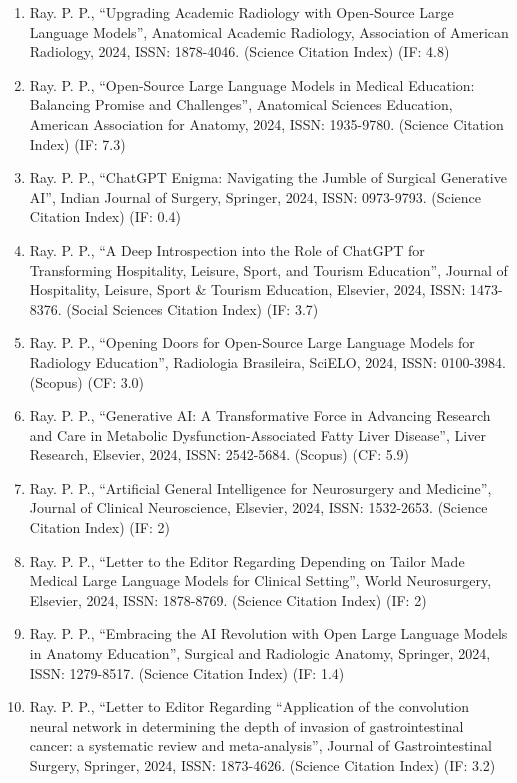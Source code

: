 \documentclass[11pt,a4paper]{moderncv}
\begin{document}
\begin{adjustwidth}{6em}{0pt}
\begin{enumerate}
		\item Ray. P. P., “Upgrading Academic Radiology with Open-Source Large Language Models”, Anatomical Academic Radiology, Association of American Radiology, 2024, ISSN: 1878-4046. (Science Citation Index) (IF: 4.8)
		\item Ray. P. P., “Open-Source Large Language Models in Medical Education: Balancing Promise and Challenges”, Anatomical Sciences Education, American Association for Anatomy, 2024, ISSN: 1935-9780. (Science Citation Index) (IF: 7.3)
		\item Ray. P. P., “ChatGPT Enigma: Navigating the Jumble of Surgical Generative AI”, Indian Journal of Surgery, Springer, 2024, ISSN: 0973-9793. (Science Citation Index) (IF: 0.4)
		\item Ray. P. P., “A Deep Introspection into the Role of ChatGPT for Transforming Hospitality, Leisure, Sport, and Tourism Education”, Journal of Hospitality, Leisure, Sport \& Tourism Education, Elsevier, 2024, ISSN: 1473-8376. (Social Sciences Citation Index) (IF: 3.7)
		\item Ray. P. P., “Opening Doors for Open-Source Large Language Models for Radiology Education”, Radiologia Brasileira, SciELO, 2024, ISSN: 0100-3984. (Scopus) (CF: 3.0)
		\item Ray. P. P., “Generative AI: A Transformative Force in Advancing Research and Care in Metabolic Dysfunction-Associated Fatty Liver Disease”, Liver Research, Elsevier, 2024, ISSN: 2542-5684. (Scopus) (CF: 5.9)
		\item Ray. P. P., “Artificial General Intelligence for Neurosurgery and Medicine”, Journal of Clinical Neuroscience, Elsevier, 2024, ISSN: 1532-2653. (Science Citation Index) (IF: 2)
		\item Ray. P. P., “Letter to the Editor Regarding Depending on Tailor Made Medical Large Language Models for Clinical Setting”, World Neurosurgery, Elsevier, 2024, ISSN: 1878-8769. (Science Citation Index) (IF: 2)
		\item Ray. P. P., “Embracing the AI Revolution with Open Large Language Models in Anatomy Education”, Surgical and Radiologic Anatomy, Springer, 2024, ISSN: 1279-8517. (Science Citation Index) (IF: 1.4)
		\item Ray. P. P., “Letter to Editor Regarding “Application of the convolution neural network in determining the depth of invasion of gastrointestinal cancer: a systematic review and meta-analysis”, Journal of Gastrointestinal Surgery, Springer, 2024, ISSN: 1873-4626. (Science Citation Index) (IF: 3.2)

\end{enumerate}
\end{adjustwidth}
\end{document}

